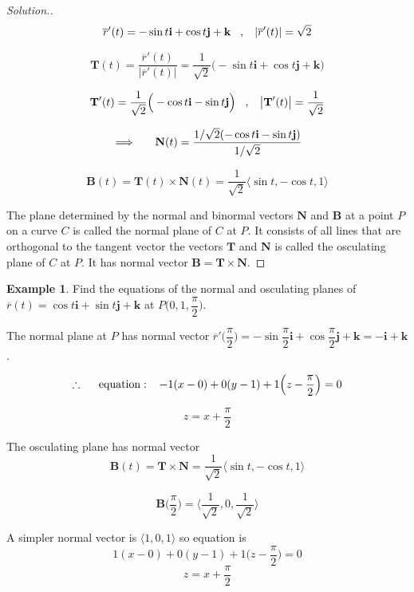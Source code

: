 \documentclass[11pt,a4paper]{article}
\theoremstyle{definition}
\newtheorem{exa}[thm]{Example}
\newenvironment{solution}
  {\renewcommand{\qedsymbol}{}\begin{proof}[\textit{Solution}.]}
  {\end{proof}}
\begin{document}
\begin{solution}
$$\overline{r}'(t) = -\sin t \textbf{i} + \cos t \textbf{j} + \textbf{k}\hspace{0.3cm} , \hspace{0.3cm} \left|\overline{r}'(t)\right| = \sqrt{2}$$

$$\textbf{T}(t) = \frac{\overline{r}'(t)}{\left|\overline{r}'(t)\right|
}=\frac{1}{\sqrt{2}}\Big(-\sin t \textbf{i} + \cos t \textbf{j} + \textbf{k}\Big)$$

$$\textbf{T}'(t) = \frac{1}{\sqrt{2}}\Big(-\cos t \textbf{i} - \sin t \textbf{j}\Big)\hspace{0.3cm}, \hspace{0.3cm} \left|\textbf{T}'(t)\right|= \frac{1}{\sqrt{2}}$$

$$\implies\hspace{0.5cm} \textbf{N}(t) = \frac{1/\sqrt{2}(-\cos t \textbf{i} - \sin t \textbf{j})}{1/\sqrt{2}}$$

$$\textbf{B}(t) = \textbf{T}(t) \times \textbf{N}(t) = \frac{1}{\sqrt{2}}\big\langle \sin t, - \cos t , 1\big\rangle$$

The plane determined by the normal and binormal vectors $\textbf{N}$ and $\textbf{B}$ at a point $P$ on a curve $C$ is called the normal plane of $C$ at $P$. It consists of all lines that are orthogonal to the tangent vector the vectors $\textbf{T}$ and $\textbf{N}$ is called the osculating plane of $C$ at $P$. It has normal vector $\textbf{B} = \textbf{T} \times \textbf{N}$.
\end{solution}


\begin{exa}


Find the equations of the normal and osculating planes of $\overline{r}(t) = \cos t\textbf{i} + \sin t \textbf{j} + \textbf{k}$ at $P\Big(0,1,\dfrac{\pi}{2}\Big)$.


The normal plane at $P$ has normal vector $\overline{r}'\Big(\dfrac{\pi}{2}\Big) = -\sin \dfrac{\pi}{2}\textbf{i} + \cos \dfrac{\pi}{2}\textbf{j} + \textbf{k} = -\textbf{i} + \textbf{k}$.

$$\therefore\hspace{0.5cm}\text{equation}:\hspace{0.3cm} -1(x - 0) + 0 ( y - 1) + 1\Big(z - \dfrac{\pi}{2}\Big) = 0$$

$$z = x + \frac{\pi}{2}$$

The osculating plane has normal vector
$$\textbf{B}(t) = \textbf{T}\times \textbf{N} = \frac{1}{\sqrt{2}}\big\langle \sin t , -\cos t ,1 \big\rangle$$

$$\textbf{B}\Big(\dfrac{\pi}{2}\Big) = \Big\langle \dfrac{1}{\sqrt{2}}, 0 , \dfrac{1}{\sqrt{2}}\Big\rangle$$

A simpler normal vector is $\big\langle 1, 0, 1\big\rangle$ so equation is $$1(x - 0) + 0 (y -1) + 1\Big(z - \dfrac{\pi}{2}\Big) = 0$$
$$z= x + \dfrac{\pi}{2}$$
\end{exa}
\end{document}
